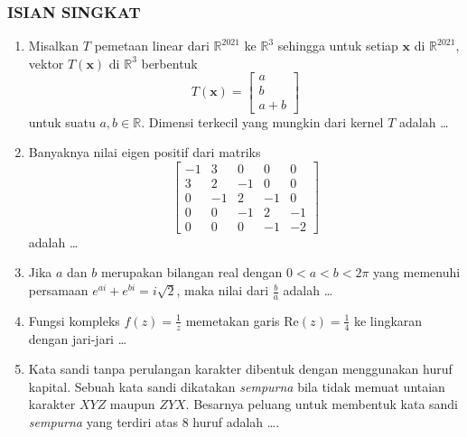 \documentclass[12pt,twoside]{article}
\begin{document}
\subsubsection*{ISIAN SINGKAT}
\begin{enumerate}
	\item Misalkan $T$ pemetaan linear dari $\mathbb{R}^{2021}$ ke $\mathbb{R}^3$ sehingga untuk setiap $\mathbf{x}$ di $\mathbb{R}^{2021}$, vektor $T(\mathbf{x})$ di $\mathbb{R}^3$ berbentuk
	      \[T(\mathbf{x})=\begin{bmatrix}
			      a \\b\\a+b
		      \end{bmatrix}\]
	      untuk suatu $a,b\in\mathbb{R}$. Dimensi terkecil yang mungkin dari kernel $T$ adalah \dots
	\item Banyaknya nilai eigen positif dari matriks
	      \[\begin{bmatrix}
			      -1 & 3  & 0  & 0  & 0  \\
			      3  & 2  & -1 & 0  & 0  \\
			      0  & -1 & 2  & -1 & 0  \\
			      0  & 0  & -1 & 2  & -1 \\
			      0  & 0  & 0  & -1 & -2
		      \end{bmatrix}\]
	      adalah \dots
	\item Jika $a$ dan $b$ merupakan bilangan real dengan $0<a<b<2\pi$ yang memenuhi persamaan $e^{ai}+e^{bi}=i\sqrt{2}$, maka nilai dari $\frac{b}{a}$ adalah \dots
	\item Fungsi kompleks $f(z)=\frac{1}{z}$ memetakan garis $\text{Re}(z)=\frac{1}{4}$ ke lingkaran dengan jari-jari \dots
	\item Kata sandi tanpa perulangan karakter dibentuk dengan menggunakan huruf kapital. Sebuah kata sandi dikatakan \textit{sempurna} bila tidak memuat untaian karakter $XYZ$ maupun $ZYX$. Besarnya peluang untuk membentuk kata sandi \textit{sempurna} yang terdiri atas 8 huruf adalah \dots.
\end{enumerate}
\end{document}

